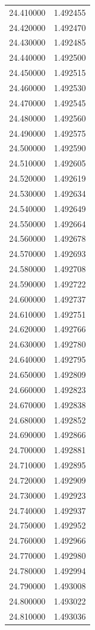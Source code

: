 \begin{tabular}{rr}
24.410000 & 1.492455 \\
24.420000 & 1.492470 \\
24.430000 & 1.492485 \\
24.440000 & 1.492500 \\
24.450000 & 1.492515 \\
24.460000 & 1.492530 \\
24.470000 & 1.492545 \\
24.480000 & 1.492560 \\
24.490000 & 1.492575 \\
24.500000 & 1.492590 \\
24.510000 & 1.492605 \\
24.520000 & 1.492619 \\
24.530000 & 1.492634 \\
24.540000 & 1.492649 \\
24.550000 & 1.492664 \\
24.560000 & 1.492678 \\
24.570000 & 1.492693 \\
24.580000 & 1.492708 \\
24.590000 & 1.492722 \\
24.600000 & 1.492737 \\
24.610000 & 1.492751 \\
24.620000 & 1.492766 \\
24.630000 & 1.492780 \\
24.640000 & 1.492795 \\
24.650000 & 1.492809 \\
24.660000 & 1.492823 \\
24.670000 & 1.492838 \\
24.680000 & 1.492852 \\
24.690000 & 1.492866 \\
24.700000 & 1.492881 \\
24.710000 & 1.492895 \\
24.720000 & 1.492909 \\
24.730000 & 1.492923 \\
24.740000 & 1.492937 \\
24.750000 & 1.492952 \\
24.760000 & 1.492966 \\
24.770000 & 1.492980 \\
24.780000 & 1.492994 \\
24.790000 & 1.493008 \\
24.800000 & 1.493022 \\
24.810000 & 1.493036 \\

\end{tabular}
